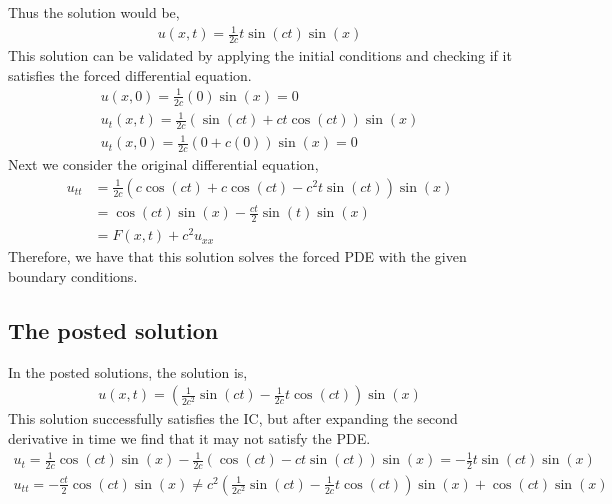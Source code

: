 \documentclass{article}
\begin{document}
Thus the solution would be, 
\begin{gather}
    u(x,t) = \frac{1}{2c}t\sin(ct)\sin(x)
\end{gather}
This solution can be validated by applying the initial conditions and checking
if it satisfies the forced differential equation. 
\begin{gather}
    u(x,0) = \frac{1}{2c}(0)\sin(x) = 0 \\
    u_t(x,t) = \frac{1}{2c}\left(\sin(ct) + ct\cos(ct)\right)\sin(x)\\
    u_t(x,0) = \frac{1}{2c}\left(0 + c(0)\right)\sin(x) = 0
\end{gather}
Next we consider the original differential equation, 
\begin{align}
    u_{tt} &= \frac{1}{2c}\left(c\cos(ct) + c\cos(ct) - c^2t\sin(ct)
    \right)\sin(x)\\
    &= \cos(ct)\sin(x) - \frac{ct}{2}\sin(t)\sin(x)\\
    &= F(x,t) + c^2u_{xx}
\end{align}
Therefore, we have that this solution solves the forced PDE with the given
boundary conditions. 


\subsection{The posted solution}
In the posted solutions, the solution is,
\begin{gather*}
    u(x,t) = \left(\frac{1}{2c^2}\sin(ct) - \frac{1}{2c}t\cos(ct)\right)\sin(x)
\end{gather*}
This solution successfully satisfies the IC, but after expanding the second
derivative in time we find that it may not satisfy the PDE. 
\begin{gather}
    u_t = \frac{1}{2c}\cos(ct)\sin(x) - \frac{1}{2c}(\cos(ct) -
    ct\sin(ct))\sin(x) = -\frac{1}{2}t\sin(ct)\sin(x)\\
    u_{tt} = -\frac{ct}{2}\cos(ct)\sin(x) \ne c^2\left(\frac{1}{2c^2}\sin(ct) - \frac{1}{2c}t\cos(ct)\right)\sin(x) + \cos(ct)\sin(x)
\end{gather}
\end{document}

